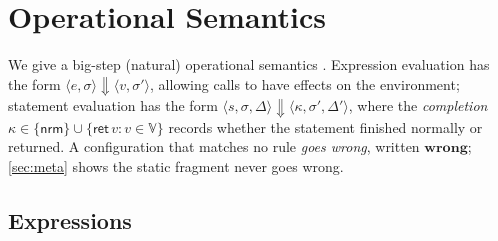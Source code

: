 \documentclass[11pt,a4paper]{article}
\theoremstyle{plain}
\theoremstyle{definition}
\theoremstyle{remark}
\newcommand{\evalto}{\Downarrow}
\newcommand{\env}{\sigma}
\newcommand{\Val}{\mathbb{V}}
\newcommand{\nrm}{\mathsf{nrm}}
\newcommand{\ret}{\mathsf{ret}}
\newcommand{\wrong}{\mathbf{wrong}}
\begin{document}
\section{Operational Semantics}
\label{sec:dynamics}

We give a big-step (natural) operational semantics \citep{kahn1987,winskel1993}.
Expression evaluation has the form
$\langle e,\env\rangle \evalto \langle v,\env'\rangle$, allowing calls to have
effects on the environment; statement evaluation has the form
$\langle s,\env,\Delta\rangle \evalto \langle\kappa,\env',\Delta'\rangle$,
where the \emph{completion} $\kappa\in\{\nrm\}\cup\{\ret\,v : v\in\Val\}$
records whether the statement finished normally or returned. A configuration
that matches no rule \emph{goes wrong}, written $\wrong$; \cref{sec:meta} shows
the static fragment never goes wrong.

\subsection{Expressions}
\label{sec:exprsem}
\end{document}
